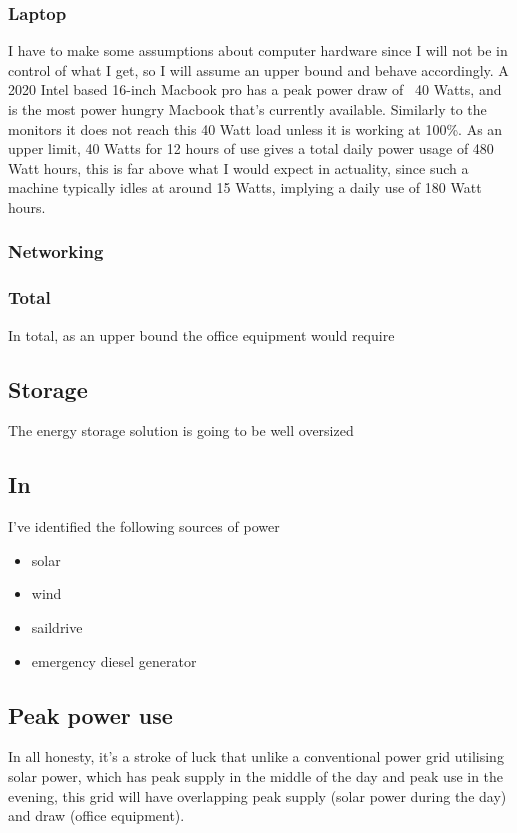 \subsubsection{Laptop}
I have to make some assumptions about computer hardware since I will not be in control of what I get, so I will assume an upper bound and behave accordingly. A 2020 Intel based 16-inch Macbook pro has a peak power draw of ~40 Watts, and is the most power hungry Macbook that's currently available. Similarly to the monitors it does not reach this 40 Watt load unless it is working at 100\%. As an upper limit, 40 Watts for 12 hours of use gives a total daily power usage of 480 Watt hours, this is far above what I would expect in actuality, since such a machine typically idles at around 15 Watts, implying a daily use of 180 Watt hours.

\subsubsection{Networking}



\subsubsection{Total}
In total, as an upper bound the office equipment would require




\subsection{Storage}
The energy storage solution is going to be well oversized

\subsection{In}
I've identified the following sources of power
\begin{itemize}
    \item solar
    \item wind
    \item saildrive
    \item emergency diesel generator
\end{itemize}

\subsection{Peak power use}
In all honesty, it's a stroke of luck that unlike a conventional power grid utilising solar power, which has peak supply in the middle of the day and peak use in the evening, this grid will have overlapping peak supply (solar power during the day) and draw (office equipment).

